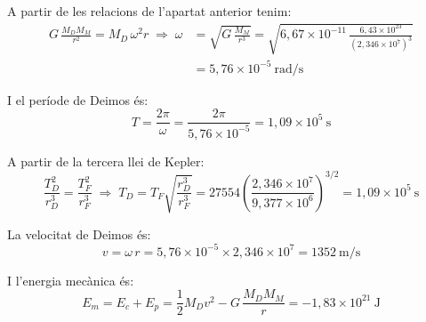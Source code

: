 \begin{solapartat}
 A partir de les relacions de l'apartat anterior tenim:
\begin{align*}
G\,\frac{M_D M_M}{r^2} = M_D\,\omega^2 r \;\Rightarrow\; \omega &= \sqrt{G\,\frac{M_M}{r^3}} = \sqrt{6,67\times 10^{-11}\,\frac{6,43\times 10^{23}}{(2,346\times 10^{7})^3}}\\
&= 5,76\times 10^{-5}\ \mathrm{rad/s}
\end{align*}

 I el període de Deimos és:
\[ T = \frac{2\pi}{\omega} = \frac{2\pi}{5,76\times 10^{-5}} = 1,09\times 10^{5}\ \mathrm{s} \]


 A partir de la tercera llei de Kepler:
\[ \frac{T_D^2}{r_D^3} = \frac{T_F^2}{r_F^3} \;\Rightarrow\; T_D = T_F\sqrt{\frac{r_D^3}{r_F^3}} = 27554\left(\frac{2,346\times 10^{7}}{9,377\times 10^{6}}\right)^{3/2} = 1,09\times 10^{5}\ \mathrm{s} \]

 La velocitat de Deimos és:
\[ v = \omega\, r = 5,76\times 10^{-5}\times 2,346\times 10^{7} = 1352\ \mathrm{m/s} \]

 I l'energia mecànica és:
\[ E_m = E_c + E_p = \frac{1}{2} M_D v^2 - G\,\frac{M_D M_M}{r} = -1,83\times 10^{21}\ \mathrm{J} \]
\end{solapartat}
